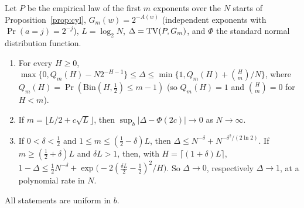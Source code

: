 \begin{theorem}\label{thm:threshold}
Let $P$ be the empirical law of the first $m$ exponents over the $N$ starts of Proposition~\ref{prop:cyl}, $G_m(w)=2^{-A(w)}$ (independent exponents with $\Pr(a=j)=2^{-j}$), $L=\log_2N$, $\Delta=\operatorname{TV}(P,G_m)$, and $\Phi$ the standard normal distribution function.
\begin{enumerate}[label=(\alph*)]
\item For every $H\ge0$, $\max\{0,Q_m(H)-N2^{-H-1}\}\le\Delta\le\min\{1,Q_m(H)+\binom Hm/N\}$, where $Q_m(H)=\Pr(\mathrm{Bin}(H,\frac12)\le m-1)$ (so $Q_m(H)=1$ and $\binom Hm=0$ for $H<m$).
\item If $m=\lfloor L/2+c\sqrt L\rfloor$, then $\sup_b|\Delta-\Phi(2c)|\to0$ as $N\to\infty$.
\item If $0<\delta<\frac12$ and $1\le m\le(\frac12-\delta)L$, then $\Delta\le N^{-\delta}+N^{-\delta^2/(2\ln2)}$. If $m\ge(\frac12+\delta)L$ and $\delta L>1$, then, with $H=\lceil(1+\delta)L\rceil$, $1-\Delta\le\frac12N^{-\delta}+\exp\bigl(-2(\frac{\delta L}2-\frac12)^2/H\bigr)$. So $\Delta\to0$, respectively $\Delta\to1$, at a polynomial rate in $N$.
\end{enumerate}
All statements are uniform in $b$.
\end{theorem}

